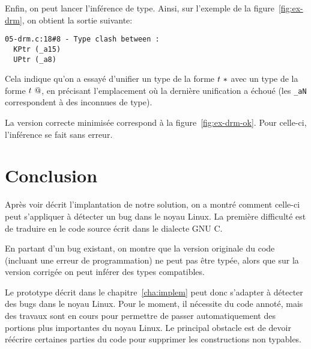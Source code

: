 Enfin, on peut lancer l'inférence de type. Ainsi, sur l'exemple de la
figure~\ref{fig:ex-drm}, on obtient la sortie suivante:

\begin{Verbatim}
05-drm.c:18#8 - Type clash between :
  KPtr (_a15)
  UPtr (_a8)
\end{Verbatim}

Cela indique qu'on a essayé d'unifier un type de la forme $t~*$ avec un
type de la forme $t~@$, en précisant l'emplacement où la dernière
unification a échoué (les \texttt{\_aN} correspondent à des inconnues de type).


La version correcte minimisée correspond à la figure~\ref{fig:ex-drm-ok}. Pour
celle-ci, l'inférence se fait sans erreur.


\section*{Conclusion}

Après voir décrit l'implantation de notre solution, on a montré comment celle-ci
peut s'appliquer à détecter un bug dans le noyau Linux. La première difficulté
est de traduire en \newspeak le code source écrit dans le dialecte GNU C.

En partant d'un bug existant, on montre que la version originale du code
(incluant une erreur de programmation) ne peut pas être typée, alors que sur la
version corrigée on peut inférer des types compatibles.

Le prototype décrit dans le chapitre~\ref{cha:implem} peut donc s'adapter à
détecter des bugs dans le noyau Linux. Pour le moment, il nécessite du code
annoté, mais des travaux sont en cours pour permettre de passer automatiquement
des portions plus importantes du noyau Linux. Le principal obstacle est de
devoir réécrire certaines parties du code pour supprimer les constructions non
typables.


